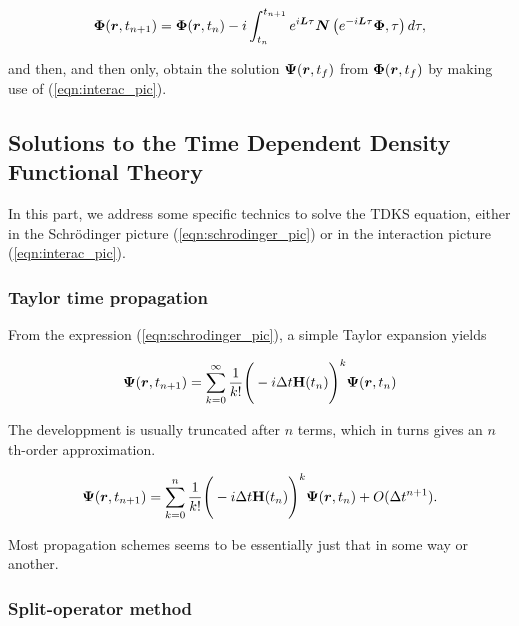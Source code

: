 \begin{equation}
   \boldsymbol{\rm \Phi}(\boldsymbol{r},t_{n+1}) 
      = \boldsymbol{\rm \Phi}(\boldsymbol{r},t_n) 
      -i \int_{t_n}^{t_{n+1}} e^{i\boldsymbol{L}\tau}
    \boldsymbol{N}\left(  e^{-i\boldsymbol{L}\tau}
     \boldsymbol{\rm\Phi},\tau\right)d\tau,
\end{equation}

\noindent and then, and then only, obtain the solution
$\boldsymbol{\rm \Psi}(\boldsymbol{r},t_f)$ from 
$\boldsymbol{\rm \Phi}(\boldsymbol{r},t_f)$  by making use of 
(\ref{eqn:interac_pic}).

\newpage

\subsection{Solutions to the Time Dependent Density Functional Theory}

In this part, we address some specific technics to solve 
the TDKS equation, 
either in the Schr\"odinger picture (\ref{eqn:schrodinger_pic})
or in the interaction picture (\ref{eqn:interac_pic}).

\subsubsection{Taylor time propagation}

From the expression (\ref{eqn:schrodinger_pic}),
a simple Taylor expansion yields

\begin{equation}
\boldsymbol{\rm \Psi}(\boldsymbol{r},t_{n+1})
   = \sum_{k=0}^\infty \frac{1}{k!}
      \Bigg( -i\Delta t\boldsymbol{\rm H}(t_n)\Bigg)^k
     \boldsymbol{\rm \Psi}(\boldsymbol{r},t_n)
     \label{eqn:taylor}
\end{equation}

\noindent The developpment is usually truncated after $n$ terms,
which in turns gives an  $n$th-order approximation.

\begin{equation}
\boldsymbol{\rm \Psi}(\boldsymbol{r},t_{n+1})
   = \sum_{k=0}^n \frac{1}{k!}
      \Bigg( -i\Delta t\boldsymbol{\rm H}(t_n)\Bigg)^k
     \boldsymbol{\rm \Psi}(\boldsymbol{r},t_n) + O(\Delta t^{n+1}).
\end{equation}

\noindent Most propagation schemes seems to be essentially just that 
in some way or another.

\subsubsection{Split-operator method}
